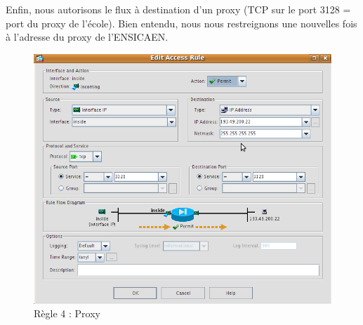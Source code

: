 \documentclass[a4paper,12pt]{article}
\begin{document}
\newpage
Enfin, nous autorisons le flux à destination d'un proxy (TCP sur le port 3128 = port du proxy de l'école). Bien entendu, nous nous restreignons une nouvelles fois à l'adresse du proxy de l'ENSICAEN. 
\begin{figure}[H]
	\center
	\includegraphics[width=15cm]{img/7-RegleProxy.png}
	\caption{Règle 4 : Proxy}
\end{figure}
\end{document}

